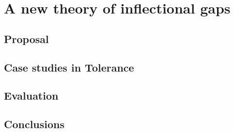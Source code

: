 \chapter{A new theory of inflectional gaps}

\citet{Halle1973}

\section{Proposal}                  
\section{Case studies in Tolerance} 
\section{Evaluation}                
\section{Conclusions}               
